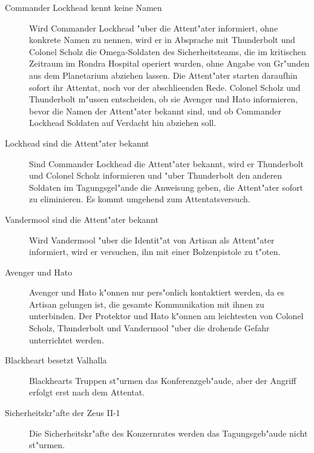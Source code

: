 \begin{description}
	\item[Commander Lockhead kennt keine Namen] Wird Commander Lockhead "uber die Attent"ater informiert, ohne konkrete Namen zu nennen, wird 
		er in Absprache mit Thunderbolt und Colonel Scholz die Omega-Soldaten des Sicherheitsteams, die im kritischen Zeitraum im Rondra Hospital operiert wurden, ohne Angabe von Gr"unden aus dem Planetarium abziehen lassen. Die Attent"ater starten daraufhin sofort ihr Attentat, noch vor der abschlie\3enden Rede. Colonel Scholz und Thunderbolt m"ussen entscheiden, ob sie Avenger und Hato informieren, bevor die Namen der Attent"ater bekannt sind, und ob Commander Lockhead Soldaten auf Verdacht hin abziehen soll.
	\item[Lockhead sind die Attent"ater bekannt] Sind Commander Lockhead die Attent"ater bekannt, wird er Thunderbolt und Colonel Scholz 
		informieren und "uber Thunderbolt den anderen Soldaten im Tagungsgel"ande die Anweisung geben, die Attent"ater sofort zu eliminieren. Es kommt umgehend zum Attentatsversuch. 
	\item[Vandermool sind die Attent"ater bekannt] Wird Vandermool "uber die Identit"at von Artisan als Attent"ater informiert, wird er 
		versuchen, ihn mit einer Bolzenpistole zu t"oten. 
	\item[Avenger und Hato] Avenger und Hato k"onnen nur pers"onlich kontaktiert werden, da es Artisan gelungen ist, die gesamte 
		Kommunikation mit ihnen zu unterbinden. Der Protektor und Hato k"onnen am leichtesten von Colonel Scholz, Thunderbolt und Vandermool "uber die drohende Gefahr unterrichtet werden.
	\item[Blackheart besetzt Valhalla] Blackhearts Truppen st"urmen das Konferenzgeb"aude, aber der Angriff erfolgt erst nach dem Attentat.
	\item[Sicherheitskr"afte der Zeus II-1] Die Sicherheitskr"afte des Konzernrates werden das Tagungsgeb"aude nicht st"urmen.
\end{description}


